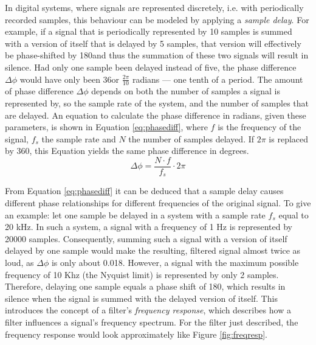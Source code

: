 \documentclass[12pt,twoside]{report}
\begin{document}
\noindent In digital systems, where signals are represented discretely, i.e. with periodically recorded samples, this behaviour can be modeled by applying a \emph{sample delay}.  For example, if a signal that is periodically represented by 10 samples is summed with a version of itself that is delayed by 5 samples, that version will effectively be phase-shifted by 180\degree and thus the summation of these two signals will result in silence. Had only one sample been delayed instead of five, the phase difference $\Delta \phi$ would have only been 36\degree or $\frac{2\pi}{10}$ radians --- one tenth of a period. The amount of phase difference $\Delta \phi$ depends on both the number of samples a signal is represented by, so the sample rate of the system, and the number of samples that are delayed. An equation to calculate the phase difference in radians, given these parameters, is shown in Equation \ref{eq:phasediff}, where $f$ is the frequency of the signal, $f_{s}$ the sample rate and $N$ the number of samples delayed. If $2\pi$ is replaced by 360, this Equation yields the same phase difference in degrees.\\

\begin{equation}
  \Delta\phi = \frac{N \cdot f}{f_{s}} \cdot 2\pi
  \label{eq:phasediff}
\end{equation}

\noindent From Equation \ref{eq:phasediff} it can be deduced that a sample delay causes different phase relationships for different frequencies of the original signal. To give an example: let one sample be delayed in a system with a sample rate $f_{s}$ equal to 20 kHz. In such a system, a signal with a frequency of 1 Hz is represented by 20000 samples. Consequently, summing such a signal with a version of itself delayed by one sample would make the resulting, filtered signal almost twice as loud, as $\Delta\phi$ is only about 0.018\degree. However, a signal with the maximum possible frequency of 10 Khz (the Nyquist limit) is represented by only 2 samples. Therefore, delaying one sample equals a phase shift of 180\degree, which results in silence when the signal is summed with the delayed version of itself. This introduces the concept of a filter's \emph{frequency response}, which describes how a filter influences a signal's frequency spectrum. For the filter just described, the frequency response would look approximately like Figure \ref{fig:freqresp}.\\
\end{document}
